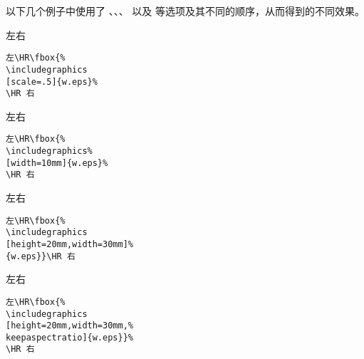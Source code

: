 以下几个例子中使用了 、、、 以及  等选项及其不同的顺序，从而得到的不同效果。

\begin{minipage}[t]{.45\textwidth}
	\vspace{0pt}
	左\HR\fbox{%
		\scalebox{0.5}{\usebox{\boxw}}}\HR 右
\end{minipage}%
\hspace{-.5cm}
\begin{minipage}[t]{.5\textwidth}
	\vspace{0pt}
\begin{Verbatim}[frame=lines,label=\colorbox{green}{\small 例一},labelposition=topline,formatcom=\color{VerbatimColor}]
左\HR\fbox{%
\includegraphics
[scale=.5]{w.eps}%
\HR 右
\end{Verbatim}
\end{minipage}

\begin{minipage}[c]{.45\textwidth}
	左\HR\fbox{%
		\resizebox{10mm}{!}{\usebox{\boxw}}}\HR 右
\end{minipage}%
\hspace{-.5cm}
\begin{minipage}[c]{.5\textwidth}
\begin{Verbatim}[frame=lines,label=\colorbox{green}{\small 例二},labelposition=topline,formatcom=\color{VerbatimColor}]
左\HR\fbox{%
\includegraphics%
[width=10mm]{w.eps}%
\HR 右
\end{Verbatim}
\end{minipage}

\begin{minipage}[c]{.45\textwidth}
	左\HR\fbox{%
		\resizebox{20mm}{30mm}{\usebox{\boxw}}}\HR 右
\end{minipage}%
\hspace{-.5cm}
\begin{minipage}[c]{.5\textwidth}
\begin{Verbatim}[frame=lines,label=\colorbox{green}{\small 例三},labelposition=topline,formatcom=\color{VerbatimColor}]
左\HR\fbox{%
\includegraphics
[height=20mm,width=30mm]%
{w.eps}}\HR 右
\end{Verbatim}
\end{minipage}

\begin{minipage}[c]{.45\textwidth}
	左\HR\fbox{%
		\texttt{[image: w]}}\HR 右
\end{minipage}%
\hspace{-.5cm}
\begin{minipage}[c]{.5\textwidth}
\begin{Verbatim}[frame=lines,label=\colorbox{green}{\small 例四},labelposition=topline,formatcom=\color{VerbatimColor}]
左\HR\fbox{%
\includegraphics
[height=20mm,width=30mm,%
keepaspectratio]{w.eps}}%
\HR 右
\end{Verbatim}
\end{minipage}


